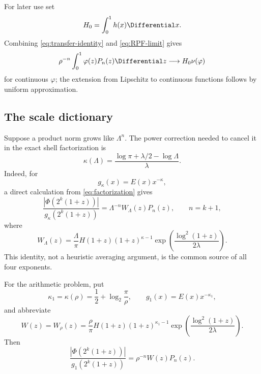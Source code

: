 \documentclass[11pt,oneside]{article}
\theoremstyle{definition}
\theoremstyle{remark}
\begin{document}
For later use set
\begin{equation}
 H_0=\int_0^1h(x)\Differential x.
 \label{eq:H0}
\end{equation}
Combining \eqref{eq:transfer-identity} and \eqref{eq:RPF-limit} gives
\begin{equation}
 \rho^{-n}\int_0^1\varphi(z)P_n(z)\Differential z
 \longrightarrow H_0\nu(\varphi)
 \label{eq:weighted-P-limit}
\end{equation}
for continuous \(\varphi\); the extension from Lipschitz to continuous
functions follows by uniform approximation.

\subsection{The scale dictionary}

Suppose a product norm grows like \(\Lambda^n\).  The power correction needed
to cancel it in the exact shell factorization is
\begin{equation}
 \boxed{
 \kappa(\Lambda)=
 \frac{\log\pi+\lambda/2-\log\Lambda}{\lambda}.}
 \label{eq:kappa-dictionary}
\end{equation}
Indeed, for
\[
 g_\kappa(x)=E(x)x^{-\kappa},
\]
a direct calculation from \eqref{eq:factorization} gives
\begin{equation}
 \frac{|\Phi(2^k(1+z))|}{g_\kappa(2^k(1+z))}
 =\Lambda^{-n}W_\Lambda(z)P_n(z),
 \qquad n=k+1,
 \label{eq:normalized-shell-general}
\end{equation}
where
\begin{equation}
 W_\Lambda(z)=\frac{\Lambda}{\pi}H(1+z)(1+z)^{\kappa-1}
 \exp\!\left(\frac{\log^2(1+z)}{2\lambda}\right).
 \label{eq:Wlambda}
\end{equation}
This identity, not a heuristic averaging argument, is the common source of all
four exponents.

For the arithmetic problem, put
\begin{equation}
 \kappa_1=\kappa(\rho)
 =\frac12+\log_2\frac\pi\rho,
 \qquad
 g_1(x)=E(x)x^{-\kappa_1},
 \label{eq:g1}
\end{equation}
and abbreviate
\begin{equation}
 W(z)=W_\rho(z)
 =\frac\rho\pi H(1+z)(1+z)^{\kappa_1-1}
 \exp\!\left(\frac{\log^2(1+z)}{2\lambda}\right).
 \label{eq:W}
\end{equation}
Then
\begin{equation}
 \boxed{
 \frac{|\Phi(2^k(1+z))|}{g_1(2^k(1+z))}
 =\rho^{-n}W(z)P_n(z).}
 \label{eq:normalized-shell}
\end{equation}
\end{document}

